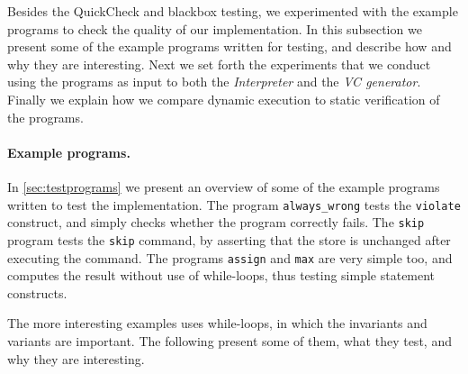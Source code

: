 Besides the QuickCheck and blackbox testing, we experimented with the example programs to check the quality of our implementation.
In this subsection we present some of the example programs written for testing, and describe how and why they are interesting.
Next we set forth the experiments that we conduct using the programs as input to both the \textit{Interpreter} and the \textit{VC generator}.
Finally we explain how we compare dynamic execution to static verification of the programs.

\paragraph{Example programs.}
In \cref{sec:testprograms} we present an overview of some of the example programs written to test the implementation.
The program \texttt{always\_wrong} tests the \texttt{violate} construct, and simply checks whether the program correctly fails.
The \texttt{skip} program tests the \texttt{skip} command, by asserting that the store is unchanged after executing the command.
The programs \texttt{assign} and \texttt{max} are very simple too, and computes the result without use of while-loops, thus testing simple statement constructs.

The more interesting examples uses while-loops, in which the invariants and variants are important. The following present some of them, what they test, and why they are interesting.

